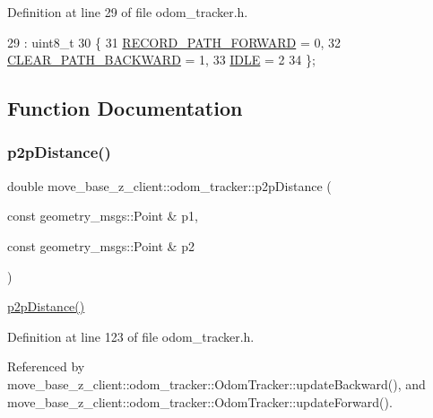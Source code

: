 Definition at line 29 of file odom\+\_\+tracker.\+h.


\begin{DoxyCode}
29                        : uint8\_t
30 \{
31     \hyperlink{namespacemove__base__z__client_1_1odom__tracker_adf3e5fc3644563922cc64a20a0197224a989d06a586bcf9520889228da7faa643}{RECORD\_PATH\_FORWARD} = 0,
32     \hyperlink{namespacemove__base__z__client_1_1odom__tracker_adf3e5fc3644563922cc64a20a0197224a0cf8f27617189e35619df3c18bda6274}{CLEAR\_PATH\_BACKWARD} = 1,
33     \hyperlink{namespacemove__base__z__client_1_1odom__tracker_adf3e5fc3644563922cc64a20a0197224aa5daf7f2ebbba4975d61dab1c40188c7}{IDLE} = 2
34 \};
\end{DoxyCode}


\subsection{Function Documentation}
\mbox{\label{namespacemove__base__z__client_1_1odom__tracker_a4437fd4b6bf9ca87f5b806ad408fb430}} 
\subsubsection{\texorpdfstring{p2p\+Distance()}{p2pDistance()}}
{\footnotesize\ttfamily double move\+\_\+base\+\_\+z\+\_\+client\+::odom\+\_\+tracker\+::p2p\+Distance (\begin{DoxyParamCaption}\item[{const geometry\+\_\+msgs\+::\+Point \&}]{p1,  }\item[{const geometry\+\_\+msgs\+::\+Point \&}]{p2 }\end{DoxyParamCaption})\hspace{0.3cm}{\ttfamily [inline]}}

\hyperlink{namespacemove__base__z__client_1_1odom__tracker_a4437fd4b6bf9ca87f5b806ad408fb430}{p2p\+Distance()} 

Definition at line 123 of file odom\+\_\+tracker.\+h.



Referenced by move\+\_\+base\+\_\+z\+\_\+client\+::odom\+\_\+tracker\+::\+Odom\+Tracker\+::update\+Backward(), and move\+\_\+base\+\_\+z\+\_\+client\+::odom\+\_\+tracker\+::\+Odom\+Tracker\+::update\+Forward().


